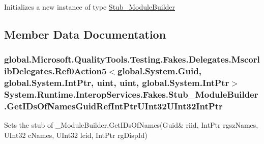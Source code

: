 Initializes a new instance of type \hyperlink{class_system_1_1_runtime_1_1_interop_services_1_1_fakes_1_1_stub___module_builder}{Stub\-\_\-\-Module\-Builder}



\subsection{Member Data Documentation}
\hypertarget{class_system_1_1_runtime_1_1_interop_services_1_1_fakes_1_1_stub___module_builder_a24f7e1349d04e8171ee162a9504007f0}{
\subsubsection[{Get\-I\-Ds\-Of\-Names\-Guid\-Ref\-Int\-Ptr\-U\-Int32\-U\-Int32\-Int\-Ptr}]{\setlength{\rightskip}{0pt plus 5cm}global.\-Microsoft.\-Quality\-Tools.\-Testing.\-Fakes.\-Delegates.\-Mscorlib\-Delegates.\-Ref0\-Action5$<$global.\-System.\-Guid, global.\-System.\-Int\-Ptr, uint, uint, global.\-System.\-Int\-Ptr$>$ System.\-Runtime.\-Interop\-Services.\-Fakes.\-Stub\-\_\-\-Module\-Builder.\-Get\-I\-Ds\-Of\-Names\-Guid\-Ref\-Int\-Ptr\-U\-Int32\-U\-Int32\-Int\-Ptr}}\label{class_system_1_1_runtime_1_1_interop_services_1_1_fakes_1_1_stub___module_builder_a24f7e1349d04e8171ee162a9504007f0}


Sets the stub of \-\_\-\-Module\-Builder.\-Get\-I\-Ds\-Of\-Names(Guid\& riid, Int\-Ptr rgsz\-Names, U\-Int32 c\-Names, U\-Int32 lcid, Int\-Ptr rg\-Disp\-Id)

